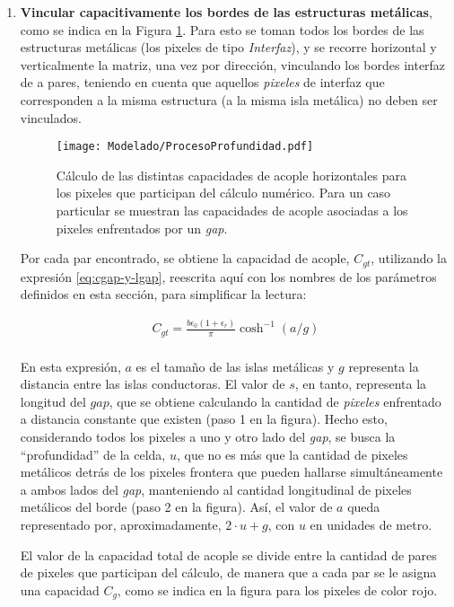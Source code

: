 \begin{enumerate}
	\item \textbf{Vincular capacitivamente los bordes de las estructuras metálicas}, como se indica en la Figura \ref{fig:calculoCapacidadTLM}. Para esto se toman todos los bordes de las estructuras metálicas (los pixeles de tipo \textit{Interfaz}), y se recorre horizontal y verticalmente la matriz, una vez por dirección, vinculando los bordes interfaz de a pares, teniendo en cuenta que aquellos \textit{pixeles} de interfaz que corresponden a la misma estructura (a la misma isla metálica) no deben ser vinculados.
	
	\begin{figure}[h]
		\centering
		\texttt{[image: Modelado/ProcesoProfundidad.pdf]}
		\caption{Cálculo de las distintas capacidades de acople horizontales para los pixeles que participan del cálculo numérico. Para un caso particular se muestran las capacidades de acople asociadas a los pixeles enfrentados por un \textit{gap}.}
		\label{fig:calculoCapacidadTLM}
	\end{figure}
	
	Por cada par encontrado, se obtiene la capacidad de acople, $C_{gt}$, utilizando la expresión \ref{eq:cgap-y-lgap}, reescrita aquí con los nombres de los parámetros definidos en esta sección, para simplificar la lectura:
	
	\begin{align*}
		C_{gt} = \frac{b \epsilon_0 (1+\epsilon_r)}{\pi} \cosh^{-1} (a / g) \\
	\end{align*}
	
	En esta expresión, $a$ es el tamaño de las islas metálicas y $g$ representa la distancia entre las islas conductoras. El valor de $s$, en tanto, representa la longitud del $gap$, que se obtiene calculando la cantidad de \textit{pixeles} enfrentado a distancia constante que existen (paso 1 en la figura). Hecho esto, considerando todos los pixeles a uno y otro lado del \textit{gap}, se busca la \enquote{profundidad} de la celda, $u$, que no es más que la cantidad de pixeles metálicos detrás de los pixeles frontera que pueden hallarse simultáneamente a ambos lados del \textit{gap}, manteniendo al cantidad longitudinal de pixeles metálicos del borde (paso 2 en la figura). Así, el valor de $a$ queda representado por, aproximadamente, $2\cdot u+g$, con $u$ en unidades de metro.
	
	El valor de la capacidad total de acople se divide entre la cantidad de pares de pixeles que participan del cálculo, de manera que a cada par se le asigna una capacidad $C_g$, como se indica en la figura para los pixeles de color rojo.
	

\end{enumerate}
